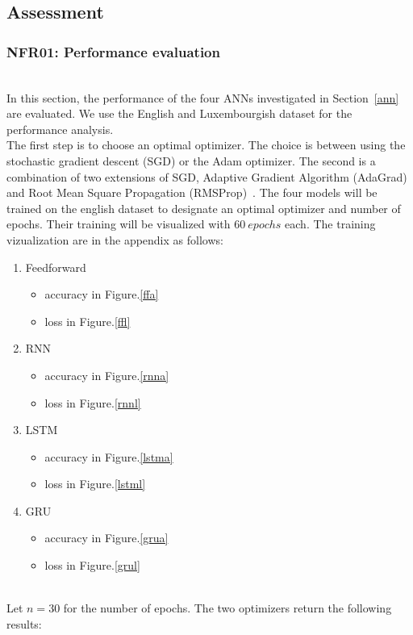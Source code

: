 % 

\subsection{Assessment}
\subsubsection{NFR01: Performance evaluation}~\\

In this section, the performance of the four ANNs investigated in
Section~\ref{ann} are evaluated. We use the English and Luxembourgish dataset
for the performance analysis.\\

The first step is to choose an optimal optimizer. The choice is between using
the stochastic gradient descent (SGD) or the Adam optimizer. The second is a
combination of two extensions of SGD, Adaptive Gradient Algorithm (AdaGrad) and
Root Mean Square Propagation (RMSProp)~\cite{Adam}. The four models will be
trained on the english dataset to designate an optimal optimizer and number of
epochs. Their training will be visualized with $60\ epochs$ each. The training
vizualization are in the appendix as follows:\\

\begin{enumerate}[label=\arabic*.]
  \item Feedforward
    \begin{itemize}
      \item accuracy in Figure.\ref{ffa}
      \item loss in Figure.\ref{ffl}
    \end{itemize}
  \item RNN
    \begin{itemize}
      \item accuracy in Figure.\ref{rnna}
      \item loss in Figure.\ref{rnnl}
    \end{itemize}
  \item LSTM
    \begin{itemize}
      \item accuracy in Figure.\ref{lstma}
      \item loss in Figure.\ref{lstml}
    \end{itemize}
  \item GRU
    \begin{itemize}
      \item accuracy in Figure.\ref{grua}
      \item loss in Figure.\ref{grul}
    \end{itemize}
\end{enumerate}~\\
Let $n=30$ for the number of epochs. The two optimizers return the following
results:

